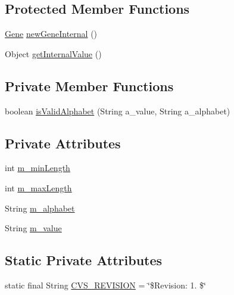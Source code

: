 \subsection*{Protected Member Functions}
\begin{DoxyCompactItemize}
\item 
\hyperlink{interfaceorg_1_1jgap_1_1_gene}{Gene} \hyperlink{classorg_1_1jgap_1_1impl_1_1_string_gene_ab9957400b5eb890f04032b5ce498cbf4}{new\-Gene\-Internal} ()
\item 
Object \hyperlink{classorg_1_1jgap_1_1impl_1_1_string_gene_a2510aeb97b5362ab5ce9e00d412873dd}{get\-Internal\-Value} ()
\end{DoxyCompactItemize}
\subsection*{Private Member Functions}
\begin{DoxyCompactItemize}
\item 
boolean \hyperlink{classorg_1_1jgap_1_1impl_1_1_string_gene_a740fba33d3662b97f31fe732674c0a13}{is\-Valid\-Alphabet} (String a\-\_\-value, String a\-\_\-alphabet)
\end{DoxyCompactItemize}
\subsection*{Private Attributes}
\begin{DoxyCompactItemize}
\item 
int \hyperlink{classorg_1_1jgap_1_1impl_1_1_string_gene_a25b50ba7f99ec2a0a8902688edabe789}{m\-\_\-min\-Length}
\item 
int \hyperlink{classorg_1_1jgap_1_1impl_1_1_string_gene_a6fda44f967e3b24f41d0d0219e3d79d3}{m\-\_\-max\-Length}
\item 
String \hyperlink{classorg_1_1jgap_1_1impl_1_1_string_gene_a19600b3076454473558a6c9841f9f956}{m\-\_\-alphabet}
\item 
String \hyperlink{classorg_1_1jgap_1_1impl_1_1_string_gene_af4f6cadf2222aa3cf573e56b4d005ad2}{m\-\_\-value}
\end{DoxyCompactItemize}
\subsection*{Static Private Attributes}
\begin{DoxyCompactItemize}
\item 
static final String \hyperlink{classorg_1_1jgap_1_1impl_1_1_string_gene_a75f05ef9c33710dd3e5e03677bdc55e2}{C\-V\-S\-\_\-\-R\-E\-V\-I\-S\-I\-O\-N} = \char`\"{}\$Revision\-: 1. \$\char`\"{}
\end{DoxyCompactItemize}



